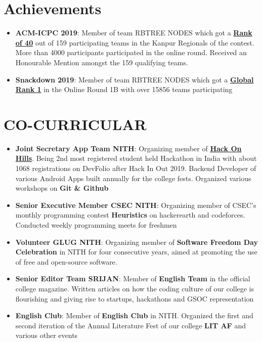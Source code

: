 \documentclass[letterpaper,11pt]{article}
\newcommand{\resumeItem}[2]{
  \item\small{
    \textbf{#1}{: #2 \vspace{-5pt}}
  }
}
\newcommand{\resumeSubItem}[2]{\resumeItem{#1}{#2}\vspace{-3pt}}
\newcommand{\resumeSubHeadingListStart}{\begin{itemize}[leftmargin=*]}
\newcommand{\resumeSubHeadingListEnd}{\end{itemize}}
\begin{document}
\section{Achievements}
  \resumeSubHeadingListStart
    \resumeSubItem{ACM-ICPC 2019}
      {Member of team RBTREE NODES which got a \href{https://www.codechef.com/public/rankings/ACM18KOL}{\textbf{Rank of 40}} out of 159 participating teams in the Kanpur Regionals of the contest. More than 4000 participants participated in the online round. Received an Honourable Mention amongst the 159 qualifying teams.}
    \resumeSubItem{Snackdown 2019}
      {Member of team RBTREE NODES which got a \href{https://www.codechef.com/rankings/SNCK1B19?order=asc&search=rbtree&sortBy=rank}{\textbf{Global Rank 1}} in the Online Round 1B with over 15856 teams participating}
  \resumeSubHeadingListEnd

\section{CO-CURRICULAR}
  \resumeSubHeadingListStart
    \resumeSubItem{Joint Secretary App Team NITH}
      {Organizing member of \href{https://www.hackonhills.com/}{\textbf{Hack On Hills}}. Being 2nd most registered student held Hackathon in India with about 1068 registrations on DevFolio after Hack In Out 2019. Backend Developer of various Android Apps built annually for the college fests. Organized various workshops on \textbf{Git \& Github}}
    \resumeSubItem{Senior Executive Member CSEC NITH}
      {Organizing member of CSEC's monthly programming contest \textbf{Heuristics} on hackerearth and codeforces. Conducted weekly programming meets for freshmen}
    \resumeSubItem{Volunteer GLUG NITH}
      {Organizing member of \textbf{Software Freedom Day Celebration} in NITH for four consecutive years, aimed at promoting the use of free and open-source software.}
    \resumeSubItem{Senior Editor Team SRIJAN}
      {Member of \textbf{English Team} in the official college magazine. Written articles on how the coding culture of our college is flourishing and giving rise to startups, hackathons and GSOC representation}
    \resumeSubItem{English Club}
      {Member of \textbf{English Club} in NITH. Organized the first and second iteration of the Annual Literature Fest of our college \textbf{LIT AF} and various other events}
  \resumeSubHeadingListEnd
\end{document}
